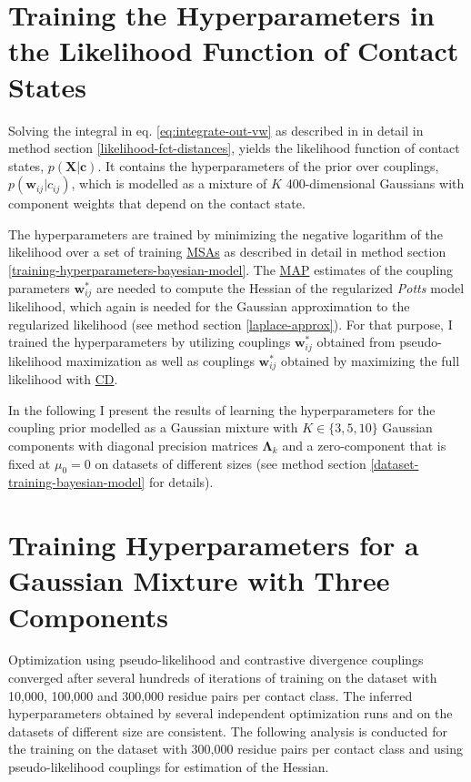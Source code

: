 \documentclass[11pt,a4paper,twoside]{book}
\newcommand{\Lk}{\mathbf{\Lambda}_k}
\renewcommand{\c}{\mathbf{c}}
\newcommand{\cij}{c_{ij}}
\newcommand{\wij}{\mathbf{w}_{ij}}
\newcommand{\X}{\mathbf{X}}
\theoremstyle{definition}
\theoremstyle{definition}
\theoremstyle{remark}
\begin{document}
\section{Training the Hyperparameters in the Likelihood Function of
Contact States}\label{bayesian-model-training-hyperparameters}

Solving the integral in eq. \eqref{eq:integrate-out-vw} as described in in
detail in method section \ref{likelihood-fct-distances}, yields the
likelihood function of contact states, \(p(\X | \c)\). It contains the
hyperparameters of the prior over couplings, \(p(\wij|\cij)\), which is
modelled as a mixture of \(K\) 400-dimensional Gaussians with component
weights that depend on the contact state.

The hyperparameters are trained by minimizing the negative logarithm of
the likelihood over a set of training \protect\hyperlink{abbrev}{MSAs}
as described in detail in method section
\ref{training-hyperparameters-bayesian-model}. The
\protect\hyperlink{abbrev}{MAP} estimates of the coupling parameters
\(\wij^*\) are needed to compute the Hessian of the regularized
\emph{Potts} model likelihood, which again is needed for the Gaussian
approximation to the regularized likelihood (see method section
\ref{laplace-approx}). For that purpose, I trained the hyperparameters
by utilizing couplings \(\wij^*\) obtained from pseudo-likelihood
maximization as well as couplings \(\wij^*\) obtained by maximizing the
full likelihood with \protect\hyperlink{abbrev}{CD}.

In the following I present the results of learning the hyperparameters
for the coupling prior modelled as a Gaussian mixture with
\(K \in \{3,5,10\}\) Gaussian components with diagonal precision
matrices \(\Lk\) and a zero-component that is fixed at \(\mu_0=0\) on
datasets of different sizes (see method section
\ref{dataset-training-bayesian-model} for details).

\section{Training Hyperparameters for a Gaussian Mixture with Three
Components}\label{training-hyperparameters-for-a-gaussian-mixture-with-three-components}

Optimization using pseudo-likelihood and contrastive divergence
couplings converged after several hundreds of iterations of training on
the dataset with 10,000, 100,000 and 300,000 residue pairs per contact
class. The inferred hyperparameters obtained by several independent
optimization runs and on the datasets of different size are consistent.
The following analysis is conducted for the training on the dataset with
300,000 residue pairs per contact class and using pseudo-likelihood
couplings for estimation of the Hessian.
\end{document}
